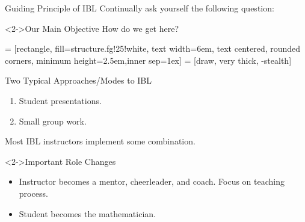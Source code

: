 \documentclass[10pt,handout]{beamer}
\begin{document}
\begin{frame}

\begin{block}{Guiding Principle of IBL}
Continually ask yourself the following question:

\vspace{1em}


\end{block}

\begin{block}<2->{Our Main Objective}
How do we get here?

\begin{center}
 = [rectangle, fill=structure.fg!25!white, text width=6em, text centered, rounded corners, minimum height=2.5em,inner sep=1ex]
 = [draw, very thick, -stealth]
\end{center}
\end{block}

\end{frame}


\begin{frame}

\begin{block}{Two Typical Approaches/Modes to IBL}
\begin{enumerate}
\item Student presentations.
\item Small group work.
\end{enumerate}
Most IBL instructors implement some combination.
\end{block}

\begin{block}<2->{Important Role Changes}
\begin{itemize}
\item Instructor becomes a mentor, cheerleader, and coach. Focus on teaching process.
\item Student becomes the mathematician.
\end{itemize}
\end{block}

\end{frame}
\end{document}
